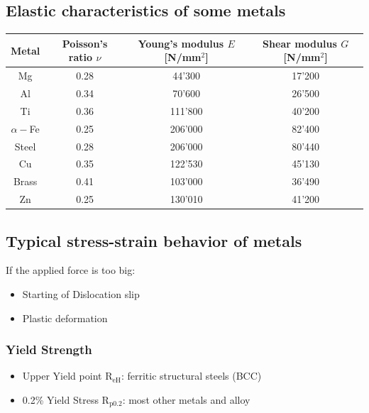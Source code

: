 \documentclass{article}
\begin{document}
\subsection{Elastic characteristics of some metals}
\begin{table}[h!]
  \centering
  \begin{tabular}{|c|c|c|c|}
    \hline
    Metal & Poisson's ratio $\nu$ & Young's modulus $E$ [N/mm$^2$] & Shear modulus $G$ [N/mm$^2$]\\
    \hline
    Mg & 0.28 & 44'300 & 17'200\\
    \hline
    Al & 0.34 & 70'600 & 26'500\\
    \hline
    Ti & 0.36 & 111'800 & 40'200\\
    \hline
    $\alpha-$Fe & 0.25 & 206'000 & 82'400\\
    \hline
    Steel & 0.28 & 206'000 & 80'440\\
    \hline
    Cu & 0.35 & 122'530 & 45'130\\
    \hline
    Brass & 0.41 & 103'000 & 36'490\\
    \hline
    Zn & 0.25 & 130'010 & 41'200\\
    \hline
  \end{tabular}
\end{table}

\newpage
\subsection{Typical stress-strain behavior of metals}
If the applied force is too big:
\begin{itemize}
  \item Starting of Dislocation slip
  \item Plastic deformation
\end{itemize}

\subsubsection{Yield Strength}
\begin{itemize}
  \item Upper Yield point R$_\text{eH}$: ferritic structural steels (BCC)
  \item 0.2\% Yield Stress R$_{\text{p}0.2}$: most other metals and alloy
\end{itemize}
\end{document}
